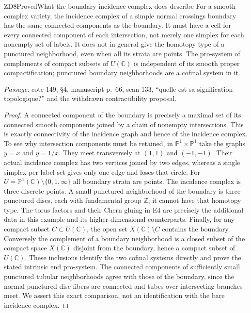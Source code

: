 \begin{result}{ZD8}{Proved}{What the boundary incidence complex does describe}
For a smooth complex variety, the incidence complex of a simple normal crossings boundary has the same connected components as the boundary. It must have a cell for every connected component of each intersection, not merely one simplex for each nonempty set of labels. It does not in general give the homotopy type of a punctured neighborhood, even when all its strata are points. The pro-system of complements of compact subsets of $U(\mathbb C)$ is independent of its smooth proper compactification; punctured boundary neighborhoods are a cofinal system in it.
\par\emph{Passage:} cote 149, \S4, manuscript p.~66, scan 133, ``quelle est sa signification topologique?'' and the withdrawn contractibility proposal.
\end{result}
\begin{proof}
A connected component of the boundary is precisely a maximal set of its connected smooth components joined by a chain of nonempty intersections. This is exactly connectivity of the incidence graph and hence of the incidence complex. To see why intersection components must be retained, in $\mathbb P^1\times\mathbb P^1$ take the graphs $y=x$ and $y=1/x$. They meet transversely at $(1,1)$ and $(-1,-1)$. Their actual incidence complex has two vertices joined by two edges, whereas a single simplex per label set gives only one edge and loses that circle.
For $U=\mathbb P^1(\mathbb C)\setminus\{0,1,\infty\}$ all boundary strata are points. The incidence complex is three discrete points. A small punctured neighborhood of the boundary is three punctured discs, each with fundamental group $\mathbb Z$; it cannot have that homotopy type. The torus factors and their Chern gluing in E4 are precisely the additional data in this example and its higher-dimensional counterparts.
Finally, for any compact subset $C\subset U(\mathbb C)$, the open set $X(\mathbb C)\setminus C$ contains the boundary. Conversely the complement of a boundary neighborhood is a closed subset of the compact space $X(\mathbb C)$ disjoint from the boundary, hence a compact subset of $U(\mathbb C)$. These inclusions identify the two cofinal systems directly and prove the stated intrinsic end pro-system. The connected components of sufficiently small punctured tubular neighborhoods agree with those of the boundary, since the normal punctured-disc fibers are connected and tubes over intersecting branches meet. We assert this exact comparison, not an identification with the bare incidence complex.
\end{proof}

